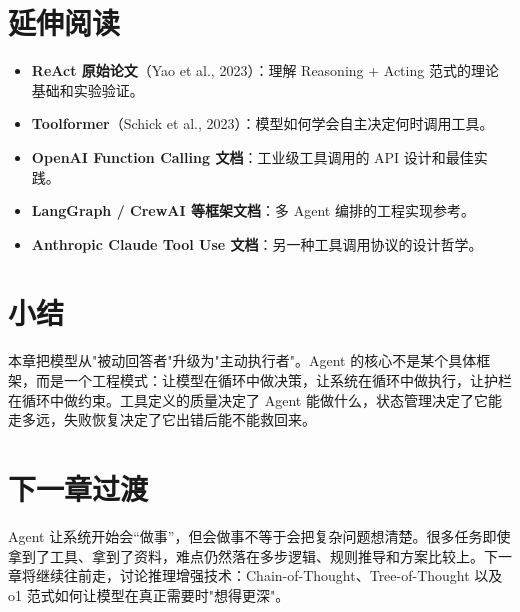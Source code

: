 \section{延伸阅读}
\begin{itemize}
  \item \textbf{ReAct 原始论文}（Yao et al., 2023）：理解 Reasoning + Acting 范式的理论基础和实验验证。
  \item \textbf{Toolformer}（Schick et al., 2023）：模型如何学会自主决定何时调用工具。
  \item \textbf{OpenAI Function Calling 文档}：工业级工具调用的 API 设计和最佳实践。
  \item \textbf{LangGraph / CrewAI 等框架文档}：多 Agent 编排的工程实现参考。
  \item \textbf{Anthropic Claude Tool Use 文档}：另一种工具调用协议的设计哲学。
\end{itemize}

\section{小结}
本章把模型从"被动回答者"升级为"主动执行者"。Agent 的核心不是某个具体框架，而是一个工程模式：让模型在循环中做决策，让系统在循环中做执行，让护栏在循环中做约束。工具定义的质量决定了 Agent 能做什么，状态管理决定了它能走多远，失败恢复决定了它出错后能不能救回来。

\section{下一章过渡}
Agent 让系统开始会“做事”，但会做事不等于会把复杂问题想清楚。很多任务即使拿到了工具、拿到了资料，难点仍然落在多步逻辑、规则推导和方案比较上。下一章将继续往前走，讨论推理增强技术：Chain-of-Thought、Tree-of-Thought 以及 o1 范式如何让模型在真正需要时"想得更深"。
